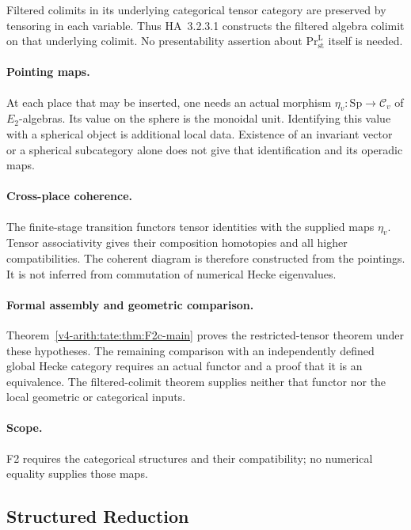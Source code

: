 Filtered colimits in its underlying categorical tensor category
are preserved by tensoring in each variable. Thus HA~3.2.3.1
constructs the filtered algebra colimit on that underlying
colimit. No presentability assertion about
\(\mathrm{Pr}^{\mathrm L}_{\mathrm{st}}\) itself is needed.

\paragraph{Pointing maps.} At each place that may be inserted,
one needs an actual morphism
\(\eta_v:\mathrm{Sp}\to\mathcal C_v\) of \(E_2\)-algebras.
Its value on the sphere is the monoidal unit. Identifying this
value with a spherical object is additional local data.
Existence of an invariant vector or a spherical subcategory
alone does not give that identification and its operadic maps.

\paragraph{Cross-place coherence.} The finite-stage transition
functors tensor identities with the supplied maps \(\eta_v\).
Tensor associativity gives their composition homotopies and
all higher compatibilities. The coherent diagram is therefore
constructed from the pointings. It is not inferred from
commutation of numerical Hecke eigenvalues.

\paragraph{Formal assembly and geometric comparison.}
Theorem~\ref{v4-arith:tate:thm:F2c-main} proves the restricted-tensor
theorem under these hypotheses. The remaining comparison with
an independently defined global Hecke category requires an
actual functor and a proof that it is an equivalence.
The filtered-colimit theorem supplies neither that functor nor
the local geometric or categorical inputs.

\paragraph{Scope.} F2 requires the categorical structures and their
compatibility; no numerical equality supplies those maps.

\subsection{Structured Reduction}

